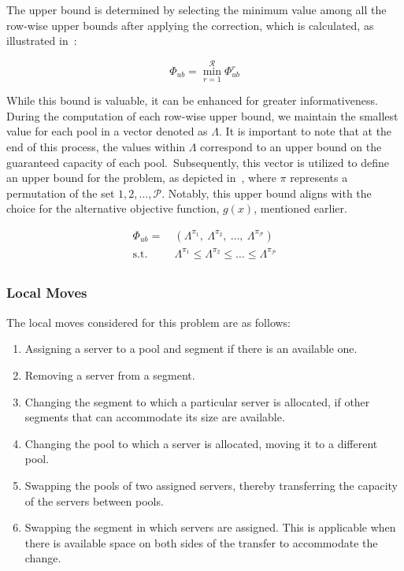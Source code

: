 The upper bound is determined by selecting the minimum value among all the
row-wise upper bounds after applying the correction, which is calculated, as
illustrated in~:

\begin{equation}
  \label{eq:odc-upper-bound}
  \Phi_{ub} = \min_{r = 1}^{\mathcal{R}} \Phi_{ub}^{r}
\end{equation}

While this bound is valuable, it can be enhanced for greater informativeness.
During the computation of each row-wise upper bound, we maintain the smallest
value for each pool in a vector denoted as $\Lambda$. It is important to note
that at the end of this process, the values within $\Lambda$ correspond to an
upper bound on the guaranteed capacity of each pool.~Subsequently, this vector
is utilized to define an upper bound for the problem, as depicted
in~, where $\pi$ represents a permutation of the set
${1, 2, \ldots, \mathcal{P}}$. Notably, this upper bound aligns with the choice
for the alternative objective function, $g(x)$, mentioned earlier.

\begin{equation}
  \label{eq:odc-upper-bound-2}
  \begin{aligned}
    \Phi_{ub}    =\  & (\Lambda^{\pi_1},\ \Lambda^{\pi_2},\ \ldots,\ \Lambda^{\pi_\mathcal{P}})     \\
    \text{s.t. }     & \Lambda^{\pi_1} \le \Lambda^{\pi_2} \le \ldots \le \Lambda^{\pi_\mathcal{P}} \\
  \end{aligned}
\end{equation}

\subsubsection*{Local Moves}

The local moves considered for this problem are as follows:

\begin{enumerate}
  \item Assigning a server to a pool and segment if there is an available one.
  \item Removing a server from a segment.
  \item Changing the segment to which a particular server is allocated, if other
        segments that can accommodate its size are available.
  \item Changing the pool to which a server is allocated, moving it to a different pool.
  \item Swapping the pools of two assigned servers, thereby transferring the
        capacity of the servers between pools.
  \item Swapping the segment in which servers are assigned. This is applicable
        when there is available space on both sides of the transfer to accommodate the
        change.
\end{enumerate}

